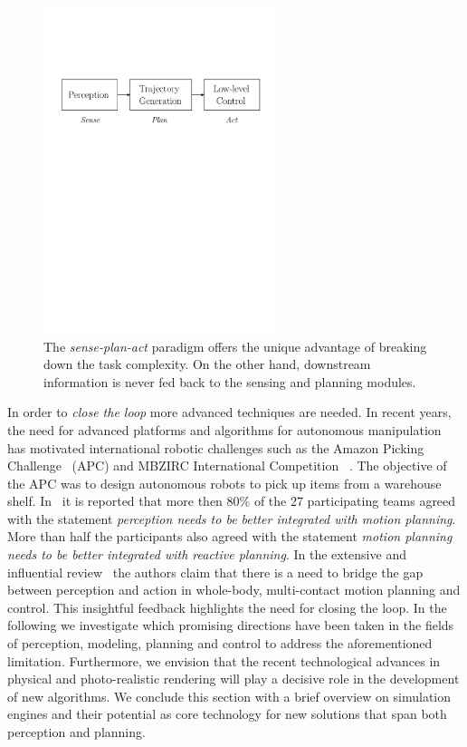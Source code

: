 \begin{figure}[b]
    \centering
    \includegraphics[width=0.6\textwidth]{images/sense_plan_act.pdf}
    \caption{The \emph{sense-plan-act} paradigm offers the unique advantage of breaking down the task complexity. On the other hand, downstream information is never fed back to the sensing and planning modules.}
    \label{fig:sense_plan_act}
\end{figure}

In order to \emph{close the loop} more advanced techniques are needed. In recent years, the need for advanced platforms and  
algorithms for autonomous manipulation has motivated international robotic challenges such as the Amazon Picking Challenge~\cite{correll2016analysis} (APC) and MBZIRC International Competition ~\cite{baca2020autonomous}. The objective of the APC was to design autonomous robots to pick up items from a warehouse shelf. In~\cite{cooper2020ari} it is reported that more then 80\% of the 27 participating teams agreed with the statement \emph{perception needs to be better integrated with motion planning}. More than half the participants also agreed with the statement \emph{motion planning needs to be better integrated with reactive planning}. In the extensive and influential review~\cite{bohg2017interactive} the authors claim that there is a need to bridge the gap between perception and action in whole-body, multi-contact motion planning and control. This insightful feedback highlights the need for closing the loop. In the following we investigate which promising directions have been taken in the fields of perception, modeling, planning and control to address the aforementioned limitation. Furthermore, we envision that the recent technological advances in physical and photo-realistic rendering will play a decisive role in the development of new algorithms. We conclude this section with a brief overview on simulation engines and their potential as core technology for new solutions that span both perception and planning. 


